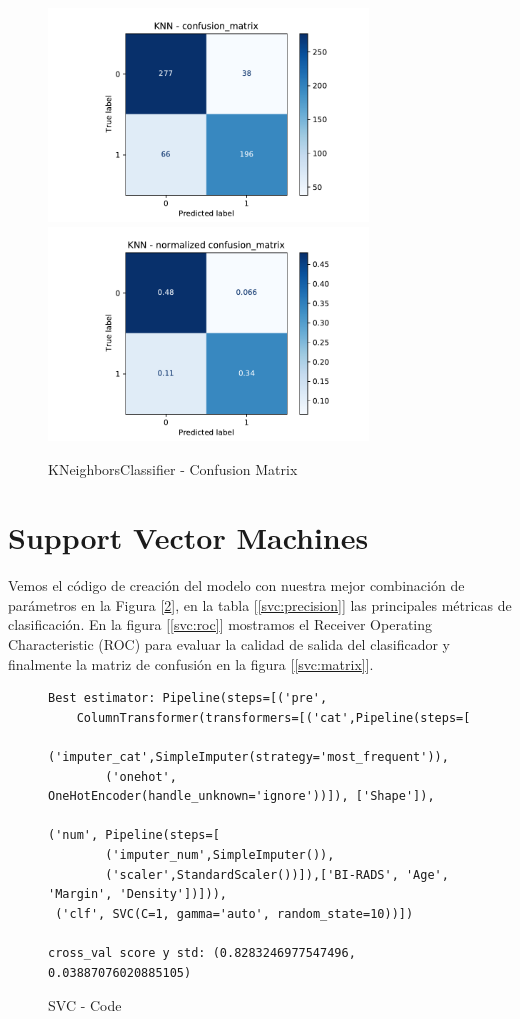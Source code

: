 \documentclass[12pt,twoside]{report}
\begin{document}
\begin{figure}[htp]
\begin{multicols}{2}
\includegraphics[width=8.5cm]{./code/figures_python/confusion_matrix/knn.pdf}%
\columnbreak
\includegraphics[width=8.5cm]{./code/figures_python/confusion_matrix/knn_normalized.pdf}%
\end{multicols}
 \caption{KNeighborsClassifier - Confusion Matrix}
  \label{knn:matrix}
 \end{figure}



\section*{Support Vector Machines}


Vemos el código de creación del modelo con nuestra mejor combinación de parámetros en la Figura [\ref{svc:code}], en la tabla [\ref{svc:precision}] las principales métricas de clasificación. En la figura [\ref{svc:roc}] mostramos el Receiver Operating Characteristic (ROC) para evaluar la calidad de salida del clasificador y finalmente la matriz de confusión en la figura [\ref{svc:matrix}].

\begin{figure}[ht]
 \begin{lstlisting}
Best estimator: Pipeline(steps=[('pre',
	ColumnTransformer(transformers=[('cat',Pipeline(steps=[
		('imputer_cat',SimpleImputer(strategy='most_frequent')),
		('onehot', OneHotEncoder(handle_unknown='ignore'))]), ['Shape']),
														('num', Pipeline(steps=[
		('imputer_num',SimpleImputer()),
		('scaler',StandardScaler())]),['BI-RADS', 'Age', 'Margin', 'Density'])])),
 ('clf', SVC(C=1, gamma='auto', random_state=10))])
                
cross_val score y std: (0.8283246977547496, 0.03887076020885105)
 \end{lstlisting}
 \caption{SVC - Code}
 \label{svc:code}
 \end{figure}
\end{document}
